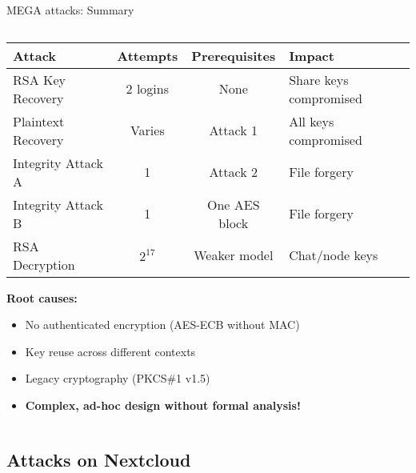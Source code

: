 \documentclass[aspectratio=169, lualatex, handout]{beamer}
\begin{document}
\begin{frame}{MEGA attacks: Summary}
	\begin{columns}[c]
		\begin{column}{1\textwidth}
			\begin{table}
				\centering
				\small
				\begin{tabular}{|l|c|c|l|}
					\hline
					\textbf{Attack}    & \textbf{Attempts} & \textbf{Prerequisites} & \textbf{Impact}        \\
					\hline
					RSA Key Recovery   & 2 logins          & None                   & Share keys compromised \\
					\hline
					Plaintext Recovery & Varies            & Attack 1               & All keys compromised   \\
					\hline
					Integrity Attack A & 1                 & Attack 2               & File forgery           \\
					\hline
					Integrity Attack B & 1                 & One AES block          & File forgery           \\
					\hline
					RSA Decryption     & $2^{17}$          & Weaker model           & Chat/node keys         \\
					\hline
				\end{tabular}
			\end{table}
			\vspace{0.5cm}
			\textbf{Root causes:}
			\begin{itemize}
				\item No authenticated encryption (AES-ECB without MAC)
				\item Key reuse across different contexts
				\item Legacy cryptography (PKCS\#1 v1.5)
				\item \textbf{Complex, ad-hoc design without formal analysis!}
			\end{itemize}
		\end{column}
	\end{columns}
\end{frame}

\subsection{Attacks on Nextcloud}
\end{document}
